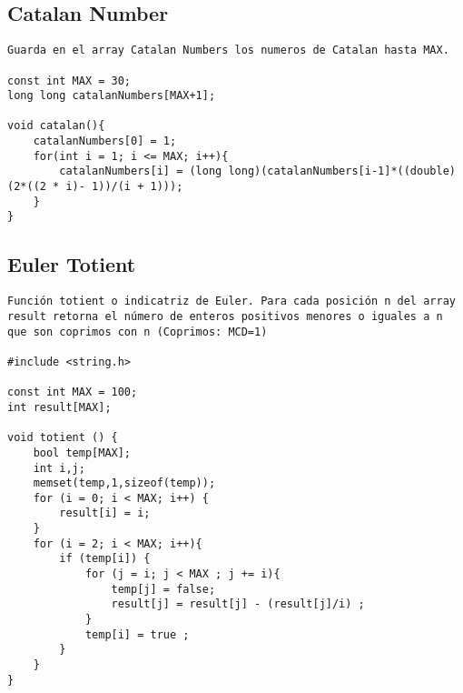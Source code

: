\documentclass[10pt,letterpaper,twocolumn,twosided]{article}
\begin{document}
\subsection{Catalan Number}
\begin{lstlisting}
Guarda en el array Catalan Numbers los numeros de Catalan hasta MAX.

const int MAX = 30;
long long catalanNumbers[MAX+1];

void catalan(){
	catalanNumbers[0] = 1;
	for(int i = 1; i <= MAX; i++){
		catalanNumbers[i] = (long long)(catalanNumbers[i-1]*((double)(2*((2 * i)- 1))/(i + 1)));
	}
}
\end{lstlisting}

\subsection{Euler Totient}
\begin{lstlisting}
Función totient o indicatriz de Euler. Para cada posición n del array result retorna el número de enteros positivos menores o iguales a n que son coprimos con n (Coprimos: MCD=1)

#include <string.h>

const int MAX = 100;
int result[MAX]; 

void totient () {
	bool temp[MAX];
	int i,j;
	memset(temp,1,sizeof(temp));
	for (i = 0; i < MAX; i++) {
		result[i] = i;
	}
	for (i = 2; i < MAX; i++){
		if (temp[i]) {
			for (j = i; j < MAX ; j += i){
				temp[j] = false;
				result[j] = result[j] - (result[j]/i) ;
			}
			temp[i] = true ;
		}
	}
}\end{lstlisting}
\end{document}
